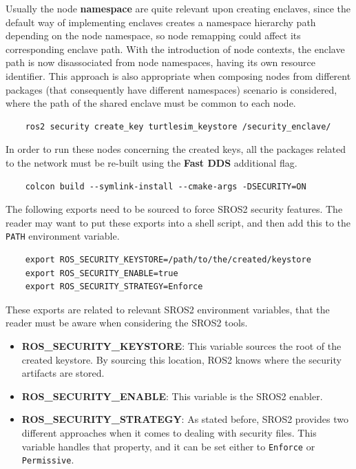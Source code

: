 Usually the node \textbf{namespace} are quite relevant upon creating enclaves, since the default way of implementing enclaves creates a namespace hierarchy path depending on the node namespace, so node remapping could affect its corresponding enclave path. With the introduction of node contexts, the enclave path is now disassociated from node namespaces, having its own resource identifier. This approach is also appropriate when composing nodes from different packages (that consequently have different namespaces) scenario is considered, where the path of the shared enclave must be common to each node. 

\begin{verbatim}
    ros2 security create_key turtlesim_keystore /security_enclave/
\end{verbatim}
            
In order to run these nodes concerning the created keys, all the packages related to the network must be re-built using the \textbf{Fast DDS} additional flag.
            
\begin{verbatim}
    colcon build --symlink-install --cmake-args -DSECURITY=ON
\end{verbatim}
            
The following exports need to be sourced to force SROS2 security features. The reader may want to put these exports into a shell script, and then add this to the \texttt{PATH} environment variable.
            
\begin{verbatim}
    export ROS_SECURITY_KEYSTORE=/path/to/the/created/keystore
    export ROS_SECURITY_ENABLE=true
    export ROS_SECURITY_STRATEGY=Enforce
\end{verbatim}

These exports are related to relevant SROS2 environment variables, that the reader must be aware when considering the SROS2 tools.

\begin{itemize}
    \item \textbf{ROS\_SECURITY\_KEYSTORE}: This variable sources the root of the created keystore. By sourcing this location, ROS2 knows where the security artifacts are stored.
    \item \textbf{ROS\_SECURITY\_ENABLE}: This variable is the SROS2 enabler.
    \item \textbf{ROS\_SECURITY\_STRATEGY}: As stated before, SROS2 provides two different approaches when it comes to dealing with security files. This variable handles that property, and it can be set either to \texttt{Enforce} or \texttt{Permissive}.
\end{itemize}

